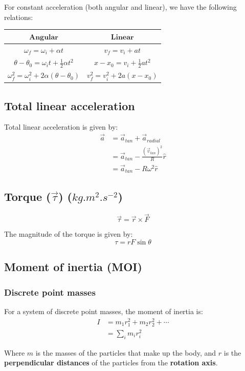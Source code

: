 \documentclass[11pt]{article}
\begin{document}
For constant acceleration (both angular and linear), we have the following relations:
\begin{center}
\begin{tabular}{ c|c }
\(\textbf{Angular}\) & \(\textbf{Linear}\) \\
\hline
\(\omega_f = \omega_i + \alpha t\) & \(v_f = v_i + at\) \\
\(\theta - \theta_0 = \omega_i t + \frac{1}{2} \alpha t^2\) & \(x - x_0 = v_i + \frac{1}{2} a t^2\) \\
\(\omega_f^2 = \omega_i^2 + 2 \alpha(\theta - \theta_0)\) & \(v_f^2 = v_i^2 + 2a(x - x_0)\)
\end{tabular}
\end{center}
\subsection{Total linear acceleration}
\label{sec:org3510ec7}
Total linear acceleration is given by:
\begin{align*}
\vec{a} &= \vec{a}_{tan} + \vec{a}_{radial} \\
&= \vec{a}_{tan} - \frac{(\vec{v}_{tan})^2}{R} \hat{r} \\
&= \vec{a}_{tan} - R \omega^2 \hat{r}
\end{align*}
\subsection{Torque (\(\vec{\tau}\)) (\(\unit{kg.m^2.s^{-2}}\))}
\label{sec:org3494644}
\[\vec{\tau} = \vec{r} \times \vec{F}\]

The magnitude of the torque is given by:
\[\tau = rF \sin \theta\]
\subsection{Moment of inertia (MOI)}
\label{sec:org562b0c5}

\subsubsection{Discrete point masses}
\label{sec:org93d9cb5}
For a system of discrete point masses, the moment of inertia is:
\begin{align*}
I &= m_1 r_1^2 + m_2 r_2^2 + \cdots \\
&= \sum_{i} m_i r_i^2
\end{align*}

Where \(m\) is the masses of the particles that make up the body, and \(r\) is the \textbf{perpendicular distances} of the particles from the \textbf{rotation axis}.
\end{document}

